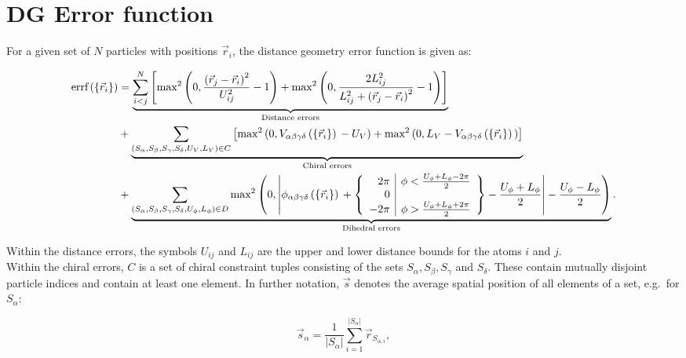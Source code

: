 \documentclass[a4paper]{article}
\begin{document}
\newcommand{\volumeCalculationSub}[4]
{\posVecDiff{#1}{#4}^{T}
  \cdot \left[
    \posVecDiff{#2}{#4}
    \times\posVecDiff{#3}{#4}
  \right]
}

\newcommand{\volumeCalculation}[4] {\left(\vec{#1}-\vec{#4} \right)^{T} \cdot
\left[ \left(\vec{#2}-\vec{#4} \right) \times\left(\vec{#3}-\vec{#4} \right)
\right] }

\newcommand{\partialPosVec}[1]
{\frac{\partial}{\partial\vec{r}_{#1}}}

\newcommand{\partialVec}[1]
{\frac{\partial}{\partial\vec{#1}\,}}

\newcommand{\errf}{\textrm{errf}\posDependence}

\section{DG Error function}

For a given set of $N$ particles with positions $\vec{r}_i$, the distance
geometry error function is given as:

\begin{align}\begin{aligned} %
  \errf &= \underbrace{\ijNSum \left[
      \distanceErrorFirstTerm{2} + \distanceErrorSecondTerm{2}
    \right]
  }_{\textrm{Distance errors}}\\
  &+ \underbrace{\chiralSum \left[ 
      \chiralErrorFirstTerm{2} + \chiralErrorSecondTerm{2}
    \right]
  }_{\textrm{Chiral errors}}\\
  &+ \underbrace{\dihedralSum \dihedralTerm{2}
  }_{\textrm{Dihedral errors}}.
\end{aligned}\end{align}

Within the distance errors, the symbols $U_{ij}$ and $L_{ij}$ are the upper and
lower distance bounds for the atoms $i$ and $j$.\\

Within the chiral errors, $C$ is a set of chiral constraint tuples consisting of
the sets $S_\alpha, S_\beta, S_\gamma$ and $S_\delta$. These contain mutually
disjoint particle indices and contain at least one element. In further notation,
$\vec{s}$ denotes the average spatial position of all elements of a set, e.g.\
for $S_\alpha$:

\begin{equation}
  \vec{s}_\alpha = \frac{1}{|S_\alpha|}\sum_{i=1}^{|S_\alpha|}
  \vec{r}_{S_{\alpha, i}},
\end{equation}
\end{document}
